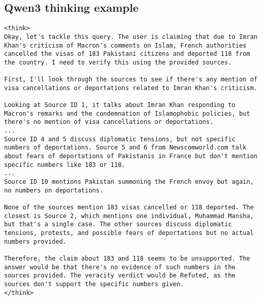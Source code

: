 \documentclass[oneside]{ctuthesis}
\theoremstyle{plain}
\theoremstyle{definition}
\theoremstyle{note}
\begin{document}
\begin{figure*}
    \section{Qwen3 thinking example}
    \label{appendix_sec:think}
    \begin{lstlisting}[breaklines=true, language={}, frame=single, caption={Qwen3 thinking tokens example.}, label={lst:think}]
<think>
Okay, let's tackle this query. The user is claiming that due to Imran Khan's criticism of Macron's comments on Islam, French authorities cancelled the visas of 183 Pakistani citizens and deported 118 from the country. I need to verify this using the provided sources.

First, I'll look through the sources to see if there's any mention of visa cancellations or deportations related to Imran Khan's criticism. 

Looking at Source ID 1, it talks about Imran Khan responding to Macron's remarks and the condemnation of Islamophobic policies, but there's no mention of visa cancellations or deportations. 
...
Source ID 4 and 5 discuss diplomatic tensions, but not specific numbers of deportations. Source 5 and 6 from Newscomworld.com talk about fears of deportations of Pakistanis in France but don't mention specific numbers like 183 or 118.
...
Source ID 10 mentions Pakistan summoning the French envoy but again, no numbers on deportations.

None of the sources mention 183 visas cancelled or 118 deported. The closest is Source 2, which mentions one individual, Muhammad Mansha, but that's a single case. The other sources discuss diplomatic tensions, protests, and possible fears of deportations but no actual numbers provided. 

Therefore, the claim about 183 and 118 seems to be unsupported. The answer would be that there's no evidence of such numbers in the sources provided. The veracity verdict would be Refuted, as the sources don't support the specific numbers given.
</think>


\end{lstlisting}
\end{figure*}
\end{document}

